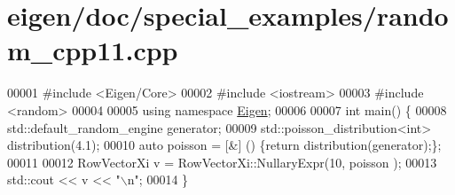 \hypertarget{eigen_2doc_2special__examples_2random__cpp11_8cpp_source}{}\section{eigen/doc/special\+\_\+examples/random\+\_\+cpp11.cpp}
\label{eigen_2doc_2special__examples_2random__cpp11_8cpp_source}

\begin{DoxyCode}
00001 \textcolor{preprocessor}{#include <Eigen/Core>}
00002 \textcolor{preprocessor}{#include <iostream>}
00003 \textcolor{preprocessor}{#include <random>}
00004 
00005 \textcolor{keyword}{using namespace }\hyperlink{namespace_eigen}{Eigen};
00006 
00007 \textcolor{keywordtype}{int} main() \{
00008   std::default\_random\_engine generator;
00009   std::poisson\_distribution<int> distribution(4.1);
00010   \textcolor{keyword}{auto} poisson = [&] () \{\textcolor{keywordflow}{return} distribution(generator);\};
00011 
00012   RowVectorXi v = RowVectorXi::NullaryExpr(10, poisson );
00013   std::cout << v << \textcolor{stringliteral}{"\(\backslash\)n"};
00014 \}
\end{DoxyCode}
